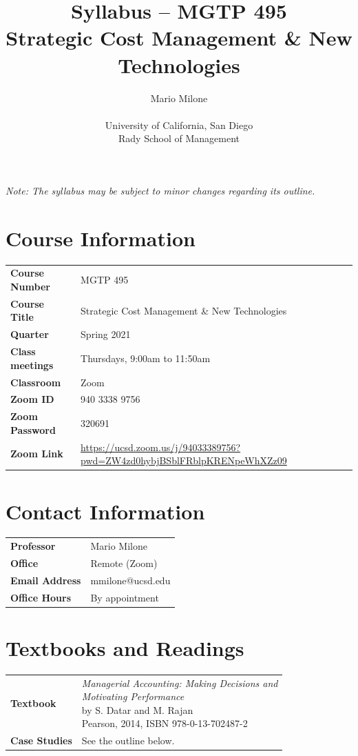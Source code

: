 \documentclass{article}
\title{Syllabus -- MGTP 495 \\ Strategic Cost Management \& New Technologies}
\author{Mario Milone \\ \\
	University of California, San Diego \\
	Rady School of Management}
\date{}
\begin{document}
\maketitle
\thispagestyle{fancy}

\emph{Note: The syllabus may be subject to minor changes regarding its
outline.}

\section*{Course Information}
\begin{tabular}{p{1.5in}l}
\bf{Course Number}	&	MGTP 495 \\
\bf{Course Title}		&	Strategic Cost Management \& New Technologies \\
\bf{Quarter}				&	Spring 2021 \\
\bf{Class meetings}	&	Thursdays, 9:00am to 11:50am \\
\bf{Classroom}			&	Zoom \\
\bf{Zoom ID}				& 940 3338 9756 \\
\bf{Zoom Password}	&	320691 \\
\bf{Zoom Link}			& \url{https://ucsd.zoom.us/j/94033389756?pwd=ZW4zd0hybjBSblFRblpKRENpeWhXZz09} \\
\end{tabular}

\section*{Contact Information}
\begin{tabular}{p{1.5in}l}
\bf{Professor}			&	Mario Milone \\
\bf{Office}					&	Remote (Zoom) \\
\bf{Email Address}	&	mmilone@ucsd.edu \\
\bf{Office Hours}		&	By appointment \\
\end{tabular}

\section*{Textbooks and Readings}
\begin{tabular}[t]{p{1.5in}l}
\bf{Textbook}		&\makecell[l]{\emph{Managerial Accounting: Making
			Decisions and} \\ \emph{Motivating Performance} \\
			by S. Datar and M. Rajan \\
			Pearson, 2014, ISBN 978-0-13-702487-2} \\
\bf{Case Studies}	&	See the outline below.
\end{tabular}
\end{document}
